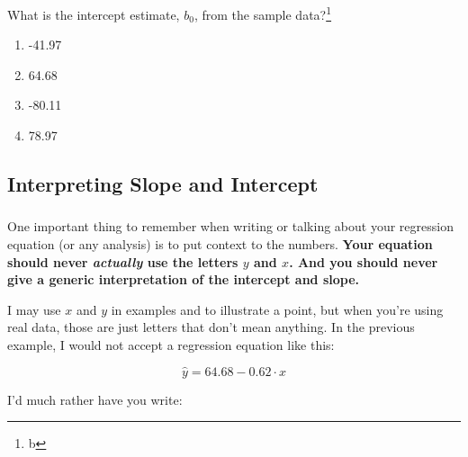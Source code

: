 \documentclass[]{article}
\let\rmarkdownfootnote\footnote%
\def\footnote{\protect\rmarkdownfootnote}
\begin{document}
What is the intercept estimate, \(b_0\), from the sample data?\footnote{b}

\begin{enumerate}
\def\labelenumi{\alph{enumi})}
\item
  -41.97
\item
  64.68
\item
  -80.11
\item
  78.97
\end{enumerate}

\hypertarget{interpreting-slope-and-intercept}{%
\subsection{Interpreting Slope and
Intercept}\label{interpreting-slope-and-intercept}}

\hypertarget{section-4}{%
\subsubsection{\texorpdfstring{\href{}{}}{}}\label{section-4}}

One important thing to remember when writing or talking about your
regression equation (or any analysis) is to put context to the numbers.
\textbf{Your equation should never \emph{actually} use the letters \(y\)
and \(x\). And you should never give a generic interpretation of the
intercept and slope.}

I may use \(x\) and \(y\) in examples and to illustrate a point, but
when you're using real data, those are just letters that don't mean
anything. In the previous example, I would not accept a regression
equation like this:

\[\hat{y}=64.68-0.62\cdot x\]

I'd much rather have you write:
\end{document}
